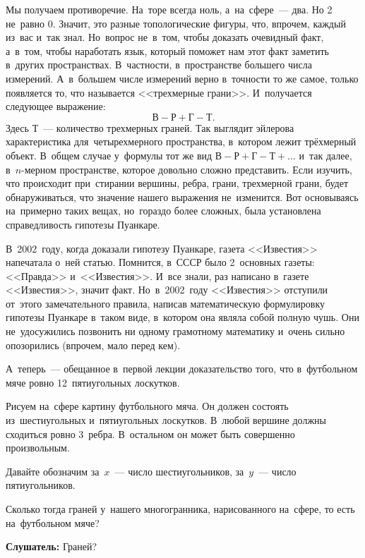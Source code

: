 Мы получаем противоречие. На~торе всегда ноль, а~на~сфере~--- два. Но 2 не~равно 0. Значит, это разные
топологические фигуры, что, впрочем, каждый из~вас и~так знал. Но~вопрос не~в~том, чтобы доказать
очевидный факт, а~в~том, чтобы наработать язык, который поможет нам этот факт заметить в~других
пространствах. В~частности, в~пространстве большего числа измерений. А~в~большем числе измерений
верно в~точности то же самое, только появляется то, что называется <<трехмерные грани>>.
И~получается следующее выражение:
$$
\text{В}-\text{Р}+\text{Г}-\text{Т}.
$$
Здесь $\text{Т}$~--- количество трехмерных граней. Так выглядит эйлерова характеристика
для~четырехмерного пространства, в~котором лежит трёхмерный объект. В~общем случае у~формулы тот же
вид $\text{В}-\text{Р}+\text{Г}-\text{Т}+\ldots$ и~так далее, в~$n$-мерном пространстве, которое довольно сложно представить. Если
изучить, что происходит при~стирании вершины, ребра, грани, трехмерной грани, будет
обнаруживаться, что значение нашего выражения не~изменится. Вот основываясь на~примерно таких
вещах, но~гораздо более сложных, была установлена справедливость гипотезы Пуанкаре.

В~2002~году, когда доказали гипотезу Пуанкаре, газета <<Известия>> напечатала о~ней статью.
Помнится, в~СССР было 2~основных газеты: <<Правда>> и~<<Известия>>. И~все знали, раз написано
в~газете <<Известия>>, значит факт. Но~в~2002~году <<Известия>> отступили от~этого замечательного
правила, написав математическую формулировку гипотезы Пуанкаре в~таком виде, в~котором она являла
собой полную чушь. Они не~удосужились позвонить ни одному грамотному математику и~очень сильно опозорились (впрочем, мало перед кем).

А~теперь~--- обещанное в~первой лекции доказательство того, что в~футбольном мяче ровно 12~пятиугольных лоскутков.

Рисуем на~сфере картину футбольного мяча. Он должен состоять из~шестиугольных и~пятиугольных
лоскутков. В~любой вершине должны сходиться ровно 3~ребра. В~остальном он может быть совершенно
произвольным.


Давайте обозначим за~$x$~--- число шестиугольников, за~$y$~--- число пятиугольников.

Сколько тогда граней у~нашего многогранника, нарисованного на~сфере, то есть на~футбольном мяче?

\textbf{Слушатель:} Граней?

